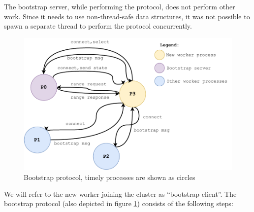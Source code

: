 \documentclass[12pt]{extarticle}
\begin{document}
The bootstrap server, while performing the protocol, does not perform other work. Since it needs to use non-thread-safe data
structures, it was not possible to spawn a separate thread to perform the protocol concurrently.

\begin{figure}[h]
    \centerline{\includegraphics[width=.8\linewidth]{imgs/bootstrapprotocol.pdf}}
    \caption{Bootstrap protocol, timely processes are shown as circles}
    \label{fig:bootstrapprotocol}
\end{figure}

We will refer to the new worker joining the cluster as ``bootstrap client''.
The bootstrap protocol (also depicted in figure \ref{fig:bootstrapprotocol}) consists of the following steps:
\end{document}
